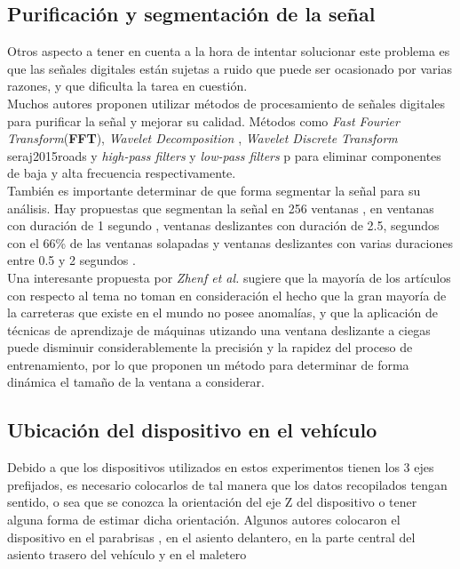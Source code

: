 	\subsection{Purificación y segmentación de la señal}
		Otros aspecto a tener en cuenta a la hora de intentar solucionar este problema es que las señales digitales están sujetas a ruido que puede ser
		ocasionado por varias razones, y que dificulta la tarea en cuestión.\\
		\indent Muchos autores proponen utilizar métodos de procesamiento de señales digitales para purificar la señal y mejorar su calidad. Métodos como \emph
		{Fast Fourier Transform}(\textbf{FFT}), \emph{Wavelet Decomposition} , \emph{Wavelet Discrete Transform} \brackcite
		{seraj2015roads} y \emph{high-pass filters} y \emph{low-pass filters} p para eliminar
		componentes de baja y alta frecuencia respectivamente.\\
		\indent También es importante determinar de que forma segmentar la señal para su análisis. Hay propuestas que segmentan la señal en 256 ventanas
		, en ventanas con duración de 1 segundo , ventanas deslizantes con duración de 2.5,
		segundos con el 66\% de las ventanas solapadas  y ventanas deslizantes con varias duraciones entre 0.5 y 2 segundos
		.\\
		\indent Una interesante propuesta por \emph{Zhenf et al.}  sugiere que la mayoría de los artículos con respecto al tema no
		toman en consideración el hecho que la gran mayoría de la carreteras que existe en el mundo no posee anomalías, y que la aplicación de técnicas
		de aprendizaje de máquinas utizando una ventana deslizante a ciegas puede disminuir considerablemente la precisión y la rapidez del proceso de
		entrenamiento, por lo que proponen un método para determinar de forma dinámica el tamaño de la ventana a considerar.\\
		
	\subsection{Ubicación del dispositivo en el vehículo}
		Debido a que los dispositivos utilizados en estos experimentos tienen los 3 ejes prefijados, es necesario colocarlos de tal manera que los
		datos recopilados tengan sentido, o sea que se conozca la orientación del eje Z del dispositivo o tener alguna forma de estimar dicha orientación.
		Algunos autores colocaron el dispositivo en el parabrisas , en el asiento delantero, en la parte
		central del asiento trasero del vehículo y en el maletero 
		
